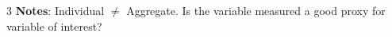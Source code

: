 \documentclass[8pt,a4paper]{extarticle}
\newcommand{\subhdr}[1]{{\bfseries\color{teal!90!black} #1}}
\newcommand{\1}{\mathds{1}}
\begin{document}
\begin{multicols*}{3}
%
%
%
%
%
%
%
%
        \subhdr{Notes}: Individual $\neq$ Aggregate. Is the variable measured a good proxy for variable of interest?



\end{multicols*}
\end{document}

